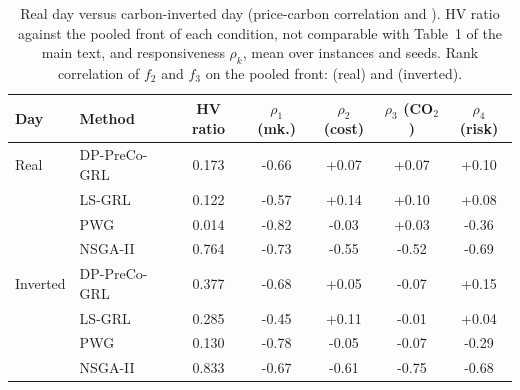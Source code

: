 \begin{table}[htbp]
\centering
\caption{Real day versus carbon-inverted day (price-carbon correlation \confCorrPriceCoReal{} and \confCorrPriceCo{}). HV ratio against the pooled front of each condition, not comparable with Table~1 of the main text, and responsiveness $\rho_k$, mean over instances and seeds. Rank correlation of $f_2$ and $f_3$ on the pooled front: \confCorrFrontReal{} (real) and \confCorrFront{} (inverted).}
\label{tab:conflict}
\scriptsize
\setlength{\tabcolsep}{2.5pt}
\begin{tabular}{llccccc}
\toprule
Day & Method & HV ratio & $\rho_1$ (mk.) & $\rho_2$ (cost) & $\rho_3$ (CO$_2$) & $\rho_4$ (risk) \\
\midrule
Real & DP-PreCo-GRL & 0.173 & -0.66 & +0.07 & +0.07 & +0.10 \\
 & LS-GRL & 0.122 & -0.57 & +0.14 & +0.10 & +0.08 \\
 & PWG & 0.014 & -0.82 & -0.03 & +0.03 & -0.36 \\
 & NSGA-II & 0.764 & -0.73 & -0.55 & -0.52 & -0.69 \\
\midrule
Inverted & DP-PreCo-GRL & 0.377 & -0.68 & +0.05 & -0.07 & +0.15 \\
 & LS-GRL & 0.285 & -0.45 & +0.11 & -0.01 & +0.04 \\
 & PWG & 0.130 & -0.78 & -0.05 & -0.07 & -0.29 \\
 & NSGA-II & 0.833 & -0.67 & -0.61 & -0.75 & -0.68 \\
\bottomrule
\end{tabular}
\end{table}
